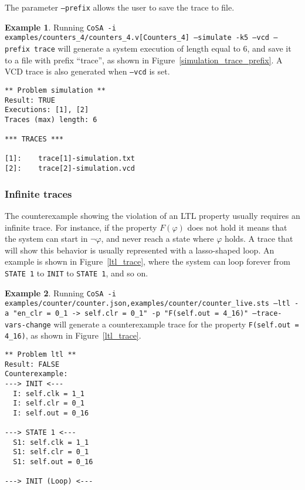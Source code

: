 \documentclass{article}
\theoremstyle{definition}
\newtheorem{example}{Example}[section]
\begin{document}
The parameter \texttt{--prefix} allows the user to save the trace to
file.

\begin{example}
  Running \texttt{CoSA -i
    examples/counters\_4/counters\_4.v[Counters\_4] --simulate -k5
    --vcd --prefix trace} will generate a system execution of length
  equal to 6, and save it to a file with prefix ``trace'', as shown in
  Figure~\ref{simulation_trace_prefix}. A VCD trace is also generated
  when \texttt{--vcd} is set.

\begin{lstlisting}[frame=single,language=ets,caption=Simulation Counter\_4 (with prefix),label=simulation_trace_prefix]
** Problem simulation **
Result: TRUE
Executions: [1], [2]
Traces (max) length: 6

*** TRACES ***

[1]:	trace[1]-simulation.txt
[2]:	trace[2]-simulation.vcd
\end{lstlisting}

\end{example}



\subsubsection{Infinite traces}

The counterexample showing the violation of an LTL property usually
requires an infinite trace. For instance, if the property $F(\varphi)$
does not hold it means that the system can start in $\neg \varphi$,
and never reach a state where $\varphi$ holds. A trace that will show
this behavior is usually represented with a lasso-shaped loop. An
example is shown in Figure~\ref{ltl_trace}, where the system can loop
forever from \texttt{STATE 1} to \texttt{INIT} to \texttt{STATE 1},
and so on.

\begin{example}
  Running \texttt{CoSA -i
    examples/counter/counter.json,examples/counter/counter\_live.sts
    --ltl -a "en\_clr = 0\_1 -> self.clr = 0\_1" -p "F(self.out =
    4\_16)" --trace-vars-change} will generate a counterexample trace
  for the property \texttt{F(self.out = 4\_16)}, as shown in
  Figure~\ref{ltl_trace}.

\begin{lstlisting}[frame=single,language=ets,caption=Simulation Counter\_4 (with changing values),label=ltl_trace]
** Problem ltl **
Result: FALSE
Counterexample:
---> INIT <---
  I: self.clk = 1_1
  I: self.clr = 0_1
  I: self.out = 0_16

---> STATE 1 <---
  S1: self.clk = 1_1
  S1: self.clr = 0_1
  S1: self.out = 0_16

---> INIT (Loop) <---
\end{lstlisting}

\end{example}
\end{document}

